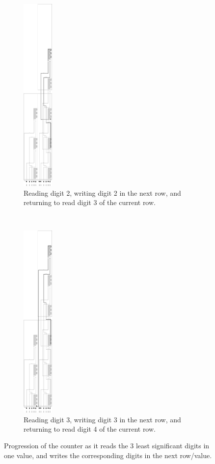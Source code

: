 \begin{figure}[H]
\begin{subfigure}[t]{0.2\textwidth}
        \includegraphics[width=0.6in]{counter_read_digit2_return_read_digit3_general_case3_middle_level}
        \caption{\label{fig:counter_read_digit2_return_read_digit3_general_case3_middle_level} Reading digit 2, writing digit 2 in the next row, and returning to read digit 3 of the current row. }
    \end{subfigure}%
    ~
    \begin{subfigure}[t]{0.2\textwidth}
        \centering
        \includegraphics[width=0.6in]{counter_read_digit3_return_read_digit1_general_case3_middle_level}
        \caption{\label{fig:counter_read_digit3_return_read_digit1_general_case3_middle_level} Reading digit 3, writing digit 3 in the next row, and returning to read digit 4 of the current row.}
    \end{subfigure}%

    \caption{\label{fig:counter_read_digit_return_read_digit_general_case3} Progression of the counter as it reads the 3 least significant digits in one value, and writes the corresponding digits in the next row/value.}
\end{figure}
